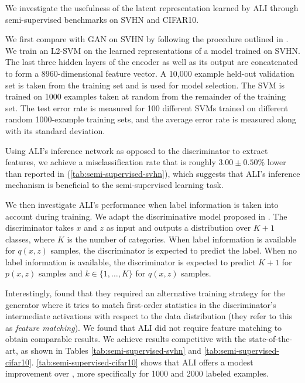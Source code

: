 \documentclass{article}
\begin{document}
We investigate the usefulness of the latent representation learned by ALI
through semi-supervised benchmarks on SVHN and CIFAR10.

We first compare with GAN on SVHN by following the procedure outlined in
\citet{radford2015unsupervised}. We train an L2-SVM on the learned
representations of a model trained on SVHN. The last three hidden layers of the
encoder as well as its output are concatenated to form a 8960-dimensional
feature vector. A 10,000 example held-out validation set is taken from the
training set and is used for model selection. The SVM is trained on 1000
examples taken at random from the remainder of the training set. The test error
rate is measured for 100 different SVMs trained on different random 1000-example
training sets, and the average error rate is measured along with its standard
deviation.

Using ALI's inference network as opposed to the discriminator to extract
features, we achieve a misclassification rate that is roughly $3.00 \pm 0.50\%$
lower than reported in \citet{radford2015unsupervised}
(\autoref{tab:semi-supervised-svhn}), which suggests that ALI's inference
mechanism is beneficial to the semi-supervised learning task.

We then investigate ALI's performance when label information is taken into
account during training. We adapt the discriminative model proposed in
\citet{Salimans2016gan}. The discriminator takes $x$ and $z$ as input and
outputs a distribution over $K + 1$ classes, where $K$ is the number of
categories. When label information is available for $q(x, z)$ samples, the
discriminator is expected to predict the label. When no label information is
available, the discriminator is expected to predict $K + 1$ for $p(x, z)$ samples
and $k \in \{1, \ldots, K\}$ for $q(x, z)$ samples.

Interestingly, \citet{Salimans2016gan} found that they required an alternative
training strategy for the generator where it tries to match first-order
statistics in the discriminator's intermediate activations with respect to the
data distribution (they refer to this as {\em feature matching}). We found that
ALI did not require feature matching to obtain comparable results. We achieve
results competitive with the state-of-the-art, as shown in Tables
\ref{tab:semi-supervised-svhn} and \ref{tab:semi-supervised-cifar10}.
\autoref{tab:semi-supervised-cifar10} shows that ALI offers a modest improvement
over \citet{Salimans2016gan}, more specifically for 1000 and 2000 labeled
examples.
\end{document}
